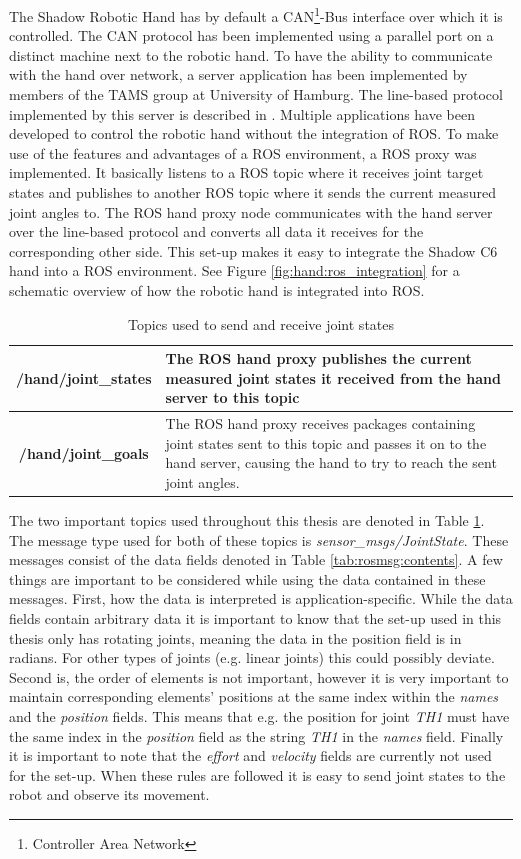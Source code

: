 The Shadow Robotic Hand has by default a CAN\footnote{Controller Area Network}-Bus interface over which it is controlled\cite{web:robothand:spec}. The CAN protocol has been implemented using a parallel port on a distinct machine next to the robotic hand. To have the ability to communicate with the hand over network, a server application has been implemented by members of the TAMS group at University of Hamburg. The line-based protocol implemented by this server is described in %
. Multiple applications have been developed to control the robotic hand without the integration of ROS. To make use of the features and advantages of a ROS environment, a ROS proxy was implemented. It basically listens to a ROS topic where it receives joint target states and publishes to another ROS topic where it sends the current measured joint angles to. The ROS hand proxy node communicates with the hand server over the line-based protocol and converts all data it receives for the corresponding other side. This set-up makes it easy to integrate the Shadow C6 hand into a ROS environment. See Figure \ref{fig:hand:ros_integration} for a schematic overview of how the robotic hand is integrated into ROS.

\begin{table}
	\caption{\label{tab:rosmsg:topics}Topics used to send and receive joint states}
	\begin{tabularx}{\linewidth}{|c|X|}
		\hline
		\textbf{/hand/joint\_states} & The ROS hand proxy publishes the current measured joint states it received from the hand server to this topic \\
		\hline
		\textbf{/hand/joint\_goals} & The ROS hand proxy receives packages containing joint states sent to this topic and passes it on to the hand server, causing the hand to try to reach the sent joint angles. \\
		\hline
	\end{tabularx}
\end{table}

The two important topics used throughout this thesis are denoted in Table \ref{tab:rosmsg:topics}. The message type used for both of these topics is \textit{sensor\_msgs/JointState}. These messages consist of the data fields denoted in Table \ref{tab:rosmsg:contents}. A few things are important to be considered while using the data contained in these messages. First, how the data is interpreted is application-specific. While the data fields contain arbitrary data it is important to know that the set-up used in this thesis only has rotating joints, meaning the data in the position field is in radians. For other types of joints (e.g. linear joints) this could possibly deviate. Second is, the order of elements is not important, however it is very important to maintain corresponding elements' positions at the same index within the \textit{names} and the \textit{position} fields. This means that e.g. the position for joint \textit{TH1} must have the same index in the \textit{position} field as the string \textit{TH1} in the \textit{names} field. Finally it is important to note that the \textit{effort} and \textit{velocity} fields are currently not used for the set-up. When these rules are followed it is easy to send joint states to the robot and observe its movement.

